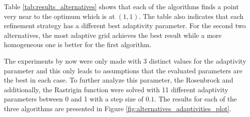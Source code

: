 Table \ref{tab:results_alternatives} shows that each of the algorithms finds a point very near to the optimum which is at $ (1,1) $. The table also indicates that each refinement strategy has a different best adaptivity parameter. For the second two alternatives, the most adaptive grid achieves the best result while a more homogeneous one is better for the first algorithm. \newline 

The experiments by now were only made with 3 distinct values for the adaptivity parameter and this only leads to assumptions that the evaluated parameters are the best in each case. To further analyze this parameter, the Rosenbrock and additionally, the Rastrigin function were solved with 11 different adaptivity parameters between 0 and 1 with a step size of $ 0.1 $. The results for each of the three algorithms are presented in Figure \ref{fig:alternatives_adaptivities_plot}.


